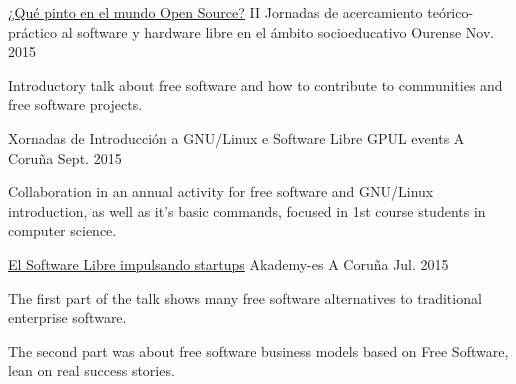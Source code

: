


\begin{cventries}


\cventry
{\href{http://castrinho8.github.io/open-community/#/}{¿Qué pinto en el mundo Open Source?}} %
{II Jornadas de acercamiento teórico-práctico al software y hardware libre en 
el ámbito socioeducativo} %
{Ourense} %
{Nov. 2015} %
{ %
\begin{cvitems}
\item {Introductory talk about free software and how to contribute to 
communities and free software projects.}
\end{cvitems}
}


\cventry
{Xornadas de Introducción a GNU/Linux e Software Libre} %
{GPUL events} %
{A Coruña} %
{Sept. 2015} %
{ %
\begin{cvitems}
\item {Collaboration in an annual activity for free software and 
GNU/Linux introduction, as well as it's basic commands, focused in 1st course 
students in computer science.}
\end{cvitems}
}


\cventry
{\href{http://castrinho8.github.io/akademy-startups-presentation/#/portada}{El Software Libre impulsando startups}} %
{Akademy-es} %
{A Coruña} %
{Jul. 2015} %
{ %
\begin{cvitems}
\item {The first part of the talk shows many free software alternatives to 
traditional enterprise software.}
\item {The second part was about free software business models based on 
Free Software, lean on real success stories.}
\end{cvitems}
}



\end{cventries}